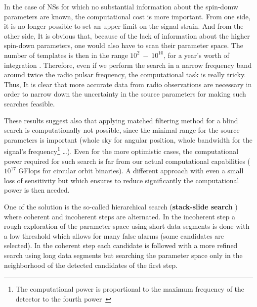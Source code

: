 In the case of NSs for which no substantial information about the spin-domw parameters are known, the computational cost is more important. From one side,  it is no longer possible to set an upper-limit on the signal strain. And  from the other side,  It is obvious that, because of the lack of information about the higher spin-down parameters,   one would also have to scan their parameter space. The number of templates is then in the range  $10^2~ - ~  10^{10}$, for a year's worth of integration  \cite{DhurandharCW}. Therefore, even if we perform the search in a narrow frequency band around twice the radio pulsar frequency, the computational task is really tricky.
Thus, It is clear that more accurate data from radio observations are necessary in order to narrow down the uncertainty in the source parameters for making such searches feasible.

These results suggest also that applying matched filtering method for a blind search is computationally not possible, since the minimal range for the source parameters is important (whole sky for angular position,  whole bandwidth for the signal's frequency\footnote{The computational power is proportional to the maximum frequency of the detector to the fourth power~\cite{DhurandharCW}} \dots).  Even for the more optimistic cases, the computational power required for such search is far from our actual computational capabilities ( $10^{17}$ GFlops for circular orbit binaries). A different approach with even a small loss of sensitivity but which ensures to reduce significantly the computational power is then needed.


One of the solution is the so-called hierarchical search ({\bf stack-slide search} \cite{BRADYbis}) where coherent and incoherent steps are alternated. In the incoherent step a rough exploration of the parameter space using short data segments is done with a low threshold which allows for many false alarms (some candidates are selected). In the coherent step each candidate is followed with a more refined search using long data segments but searching the parameter space only in the neighborhood of the detected candidates of the first step.



